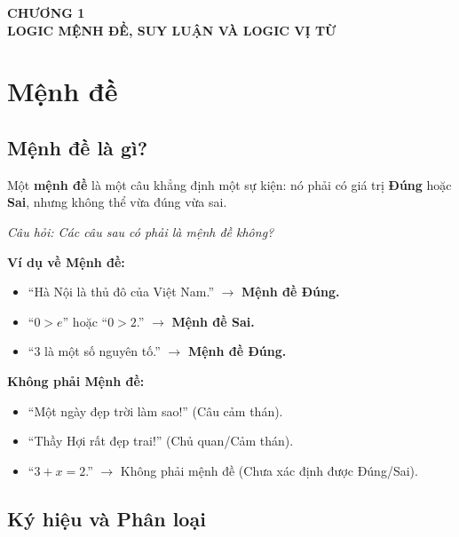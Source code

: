 \documentclass[12pt,a4paper]{article}
\begin{document}
\begin{center}
  {\LARGE\bfseries\color{PrimaryBlue} CHƯƠNG 1}\\[4pt]
  {\large\bfseries LOGIC MỆNH ĐỀ, SUY LUẬN VÀ LOGIC VỊ TỪ}
\end{center}
\vspace{4pt}

\section{Mệnh đề}

\subsection{Mệnh đề là gì?}

Một \textbf{mệnh đề} là một câu khẳng định một sự kiện: nó phải có giá trị \textbf{Đúng} hoặc \textbf{Sai}, nhưng không thể vừa đúng vừa sai.

\textit{Câu hỏi: Các câu sau có phải là mệnh đề không?}

\textbf{Ví dụ về Mệnh đề:}
\begin{itemize}
  \item ``Hà Nội là thủ đô của Việt Nam.'' $\rightarrow$ \textcolor{AccentGreen}{\textbf{Mệnh đề Đúng.}}
  \item ``$0 > e$'' hoặc ``$0 > 2$.'' $\rightarrow$ \textcolor{AccentRed}{\textbf{Mệnh đề Sai.}}
  \item ``$3$ là một số nguyên tố.'' $\rightarrow$ \textcolor{AccentGreen}{\textbf{Mệnh đề Đúng.}}
\end{itemize}

\textbf{Không phải Mệnh đề:}
\begin{itemize}
  \item ``Một ngày đẹp trời làm sao!'' (Câu cảm thán).
  \item ``Thầy Hợi rất đẹp trai!'' (Chủ quan/Cảm thán).
  \item ``$3 + x = 2$.'' $\rightarrow$ Không phải mệnh đề (Chưa xác định được Đúng/Sai).
\end{itemize}

\subsection{Ký hiệu và Phân loại}
\end{document}
